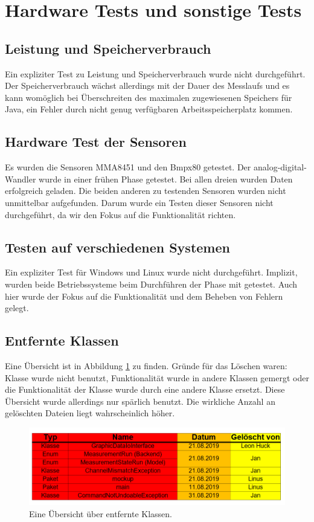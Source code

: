 \documentclass[parskip=full]{scrartcl}
\begin{document}
\clearpage
\section{Hardware Tests und sonstige Tests} \label{sonstiges}


\subsection{Leistung und Speicherverbrauch}
Ein expliziter Test zu Leistung und Speicherverbrauch wurde nicht durchgeführt. Der Speicherverbrauch wächst allerdings mit der Dauer des Messlaufs und es kann womöglich bei Überschreiten des maximalen zugewiesenen Speichers für Java, ein Fehler durch nicht genug verfügbaren Arbeitsspeicherplatz kommen.

\subsection{Hardware Test der Sensoren}
Es wurden die Sensoren MMA8451 und den Bmpx80 getestet. Der analog-digital-Wandler wurde in einer frühen Phase getestet.
Bei allen dreien wurden Daten erfolgreich geladen. Die beiden anderen zu testenden Sensoren wurden nicht unmittelbar aufgefunden. Darum wurde ein Testen dieser Sensoren nicht durchgeführt, da wir den Fokus auf die Funktionalität richten.

\subsection{Testen auf verschiedenen Systemen}

Ein expliziter Test für Windows und Linux wurde nicht durchgeführt. Implizit, wurden beide Betriebssysteme beim Durchführen der Phase mit getestet. Auch hier wurde der Fokus auf die Funktionalität und dem Beheben von Fehlern gelegt.

\subsection{Entfernte Klassen}
Eine Übersicht ist in Abbildung \ref{deletedFiles} zu finden. Gründe für das Löschen waren: Klasse wurde nicht benutzt, Funktionalität wurde in andere Klassen gemergt oder die Funktionalität der Klasse wurde durch eine andere Klasse ersetzt. Diese Übersicht wurde allerdings nur spärlich benutzt. Die wirkliche Anzahl an gelöschten Dateien liegt wahrscheinlich höher.

\begin{figure}[htbp]
	\begin{center}
		\includegraphics[width = 14cm]{Grafiken/deletedFiles.PNG}
		\caption{Eine Übersicht über entfernte Klassen.}
		\label{deletedFiles}
	\end{center}
\end{figure}
\end{document}
